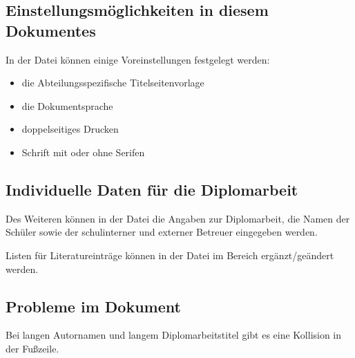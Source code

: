 \subsection{Einstellungsmöglichkeiten in diesem Dokumentes}
In der Datei  können einige Voreinstellungen festgelegt werden:
\begin{itemize}
	\item die Abteilungsspezifische Titelseitenvorlage
	\item die Dokumentsprache
	\item doppelseitiges Drucken
	\item Schrift mit oder ohne Serifen
\end{itemize}

\subsection{Individuelle Daten für die Diplomarbeit}
Des Weiteren können in der Datei   die Angaben zur Diplomarbeit, die Namen der Schüler sowie der schulinterner und externer Betreuer eingegeben werden.


Listen für Literatureinträge können in der Datei  im Bereich  ergänzt/geändert werden.



\subsection{Probleme im Dokument}
Bei langen Autornamen und langem Diplomarbeitstitel gibt es eine Kollision in der Fußzeile.